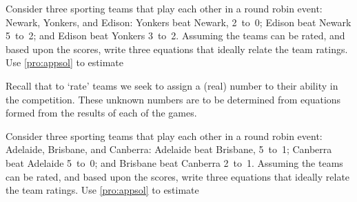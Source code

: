 
\begin{exercise}  
Consider three sporting teams that play each other in a round robin  event: Newark, Yonkers, and Edison:
Yonkers beat Newark, 2~to~0;
Edison beat Newark 5~to~2; and
Edison beat Yonkers 3~to~2.
Assuming the teams can be rated, and  based upon the scores, write three equations that ideally relate the team ratings.  
Use \cref{pro:appsol} to estimate 

Recall that to `rate' teams we seek to assign a (real) number to their ability in the competition.  These unknown numbers are to be determined from equations formed from the results of each of the games.
\end{exercise}



\begin{OmitV1}
\begin{exercise}  
Consider three sporting teams that play each other in a round robin  event: Adelaide, Brisbane, and Canberra:
Adelaide beat Brisbane, 5~to~1;
Canberra beat Adelaide 5~to~0; and
Brisbane beat Canberra 2~to~1.
Assuming the teams can be rated, and  based upon the scores, write three equations that ideally relate the team ratings.  
Use \cref{pro:appsol} to estimate 
\end{exercise}
\end{OmitV1}



